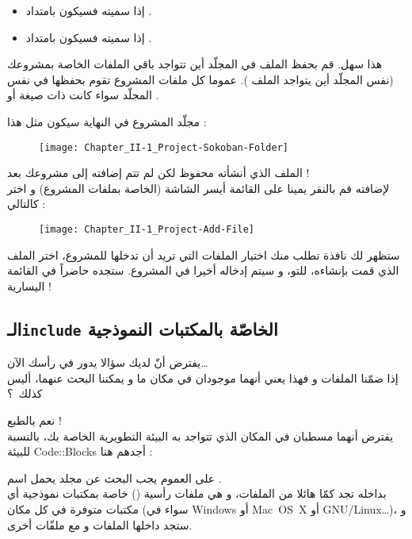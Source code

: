 \begin{itemize}
  \item إذا سميته
فسيكون بامتداد
.
  \item إذا سميته
فسيكون بامتداد
.
\end{itemize}

هذا سهل. قم بحفظ الملف في المجلّد أين تتواجد باقي الملفات الخاصة بمشروعك (نفس المجلّد أين يتواجد الملف
). عموما كل ملفات المشروع تقوم بحفظها في نفس المجلّد سواء كانت ذات صيغة
أو
.

مجلّد المشروع في النهاية سيكون مثل هذا :

\begin{figure}[H]
	\centering
	\texttt{[image: Chapter\_II-1\_Project-Sokoban-Folder]}
\end{figure}

الملف الذي أنشأته محفوظ لكن لم تتم إضافته إلى مشروعك بعد !\\
لإضافته قم بالنقر يمينا على القائمة أيسر الشاشة (الخاصة بملفات المشروع) و اختر
كالتالي :

\begin{figure}[H]
	\centering
	\texttt{[image: Chapter\_II-1\_Project-Add-File]}
\end{figure}

ستظهر لك نافذة تطلب منك اختيار الملفات التي تريد أن تدخلها للمشروع، اختر الملف الذي قمت بإنشاءه، للتو، و سيتم إدخاله أخيرا في المشروع.  ستجده حاضراً في القائمة اليسارية !

\subsection{الـ\texttt{include} الخاصّة بالمكتبات النموذجية}

يفترض أنّ لديك سؤالا يدور في رأسك الآن\dots\\
إذا ضمّنا الملفات
و
فهذا يعني أنهما موجودان في مكان ما و يمكننا البحث عنهما، أليس كذلك~؟

نعم بالطبع !\\
يفترض أنهما مسطبان في المكان الذي تتواجد به البيئة التطويرية الخاصة بك، بالنسبة للبيئة
\textenglish{Code::Blocks}
أجدهم هنا :


على العموم يجب البحث عن مجلد يحمل اسم
.\\
بداخله تجد كمّا هائلا من الملفات، و هي ملفات رأسية
()
خاصة بمكتبات نموذجية أي مكتبات متوفرة في كل مكان (سواء في 
\textenglish{Windows}
أو
\textenglish{\mbox{Mac OS X}}
أو 
\textenglish{\mbox{GNU/Linux}}\dots)،
و ستجد داخلها الملفات
و
مع ملفّات أخرى.

